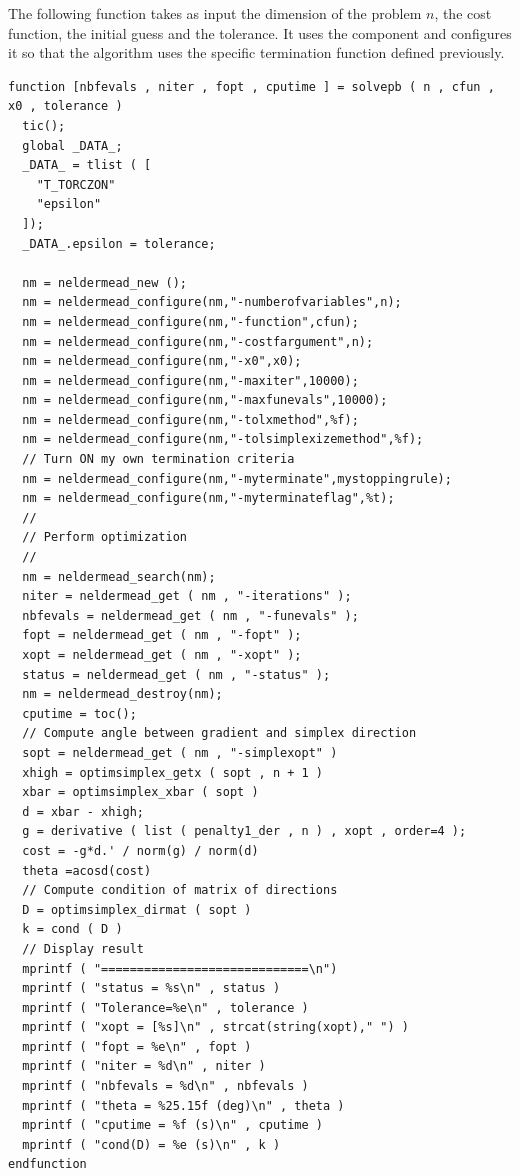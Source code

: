 The following  function takes as input the dimension
of the problem $n$, the cost function, the initial guess and the tolerance.
It uses the  component and configures it so that 
the algorithm uses the specific termination function defined previously.

\lstset{language=scilabscript}
\begin{lstlisting}
function [nbfevals , niter , fopt , cputime ] = solvepb ( n , cfun , x0 , tolerance )
  tic();
  global _DATA_;
  _DATA_ = tlist ( [
    "T_TORCZON"
    "epsilon"
  ]);
  _DATA_.epsilon = tolerance;
  
  nm = neldermead_new ();
  nm = neldermead_configure(nm,"-numberofvariables",n);
  nm = neldermead_configure(nm,"-function",cfun);
  nm = neldermead_configure(nm,"-costfargument",n);
  nm = neldermead_configure(nm,"-x0",x0);
  nm = neldermead_configure(nm,"-maxiter",10000);
  nm = neldermead_configure(nm,"-maxfunevals",10000);
  nm = neldermead_configure(nm,"-tolxmethod",%f);
  nm = neldermead_configure(nm,"-tolsimplexizemethod",%f);
  // Turn ON my own termination criteria
  nm = neldermead_configure(nm,"-myterminate",mystoppingrule);
  nm = neldermead_configure(nm,"-myterminateflag",%t);
  //
  // Perform optimization
  //
  nm = neldermead_search(nm);
  niter = neldermead_get ( nm , "-iterations" );
  nbfevals = neldermead_get ( nm , "-funevals" );
  fopt = neldermead_get ( nm , "-fopt" );
  xopt = neldermead_get ( nm , "-xopt" );
  status = neldermead_get ( nm , "-status" );
  nm = neldermead_destroy(nm);
  cputime = toc();
  // Compute angle between gradient and simplex direction
  sopt = neldermead_get ( nm , "-simplexopt" )
  xhigh = optimsimplex_getx ( sopt , n + 1 )
  xbar = optimsimplex_xbar ( sopt )
  d = xbar - xhigh;
  g = derivative ( list ( penalty1_der , n ) , xopt , order=4 );
  cost = -g*d.' / norm(g) / norm(d)
  theta =acosd(cost)
  // Compute condition of matrix of directions
  D = optimsimplex_dirmat ( sopt )
  k = cond ( D )
  // Display result
  mprintf ( "=============================\n")
  mprintf ( "status = %s\n" , status )
  mprintf ( "Tolerance=%e\n" , tolerance )
  mprintf ( "xopt = [%s]\n" , strcat(string(xopt)," ") )
  mprintf ( "fopt = %e\n" , fopt )
  mprintf ( "niter = %d\n" , niter )
  mprintf ( "nbfevals = %d\n" , nbfevals )
  mprintf ( "theta = %25.15f (deg)\n" , theta )
  mprintf ( "cputime = %f (s)\n" , cputime )
  mprintf ( "cond(D) = %e (s)\n" , k )
endfunction
\end{lstlisting}


